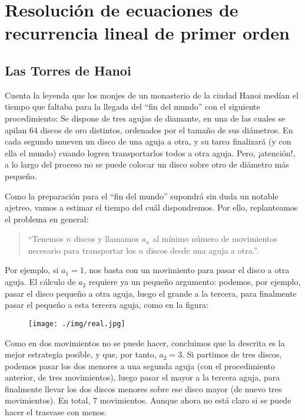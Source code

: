 \documentclass{article}
\begin{document}
\section{Resolución de ecuaciones de recurrencia lineal de primer orden}

\subsection{Las Torres de Hanoi}

Cuenta la leyenda que los monjes de un monasterio de la ciudad Hanoi medían el tiempo que faltaba para la llegada del ``fin del mundo'' con el siguiente procedimiento: Se dispone de tres agujas de diamante, en una de las cuales se apilan $64$ discos de oro distintos, ordenados por el tamaño de sus diámetros. En cada segundo mueven un disco de una aguja a otra, y su tarea finalizará (y con ella el mundo) cuando logren transportarlos todos a otra aguja. Pero, ¡atención!, a lo largo del proceso no se puede colocar un disco sobre otro de diámetro más pequeño.

Como la preparación para el ``fin del mundo'' supondrá sin duda un notable ajetreo, vamos a estimar el tiempo del cuál dispondremos. Por ello, replanteamos el problema en general:

\begin{quote}
	``Tenemos $n$ discos y llamamos $a_n$ al mínimo número de movimientos necesario para transportar los $n$ discos desde una aguja a otra.''.
\end{quote}

Por ejemplo, si $a_{1}=1$, nos basta con un movimiento para pasar el disco a otra aguja. El cálculo de $a_2$ requiere ya un pequeño argumento: podemos, por ejemplo, pasar el disco pequeño a otra aguja, luego el grande a la tercera, para finalmente pasar el pequeño a esta tercera aguja, como en la figura:

\begin{figure}[h]
\centering
\texttt{[image: ./img/real.jpg]}
\end{figure}

Como en dos movimientos no se puede hacer, concluimos que la descrita es la mejor estrategia posible, y que, por tanto, $a_2 = 3$. Si partimos de tres discos, podemos pasar los dos menores a una segunda aguja (con el procedimiento anterior, de tres movimientos), luego pasar el mayor a la tercera aguja, para finalmente llevar los dos discos menores sobre ese disco mayor (de nuevo tres movimientos). En total, $7$ movimientos. Aunque ahora no está claro si se puede hacer el trasvase con menos.
\end{document}
